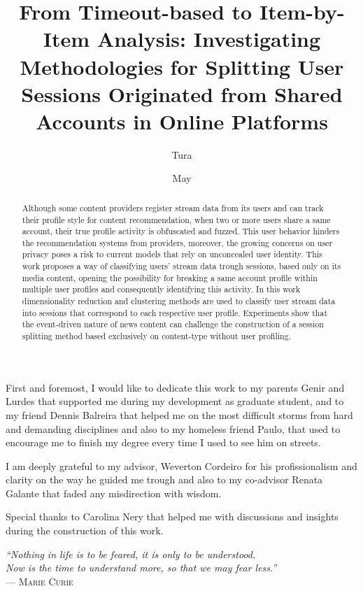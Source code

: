 \documentclass[ecp,tc,english]{iiufrgs}
\title{From Timeout-based to Item-by-Item Analysis: Investigating Methodologies for Splitting User Sessions Originated from Shared Accounts in Online Platforms}
\author{Tura}{Matheus Toazza}
\date{May}{2021}
\begin{document}
\maketitle

\begin{acknowledgements}
First and foremost, I would like to dedicate this work to my parents Genir and Lurdes that supported me during my development as graduate student, and to my friend Dennis Balreira that helped me on the most difficult storms from hard and demanding disciplines and also to my homeless friend Paulo, that used to encourage me to finish my degree every time I used to see him on streets.

I am deeply grateful to my advisor, Weverton Cordeiro for his profissionalism and clarity on the way he guided me trough and also to my co-advisor Renata Galante that faded any misdirection with wisdom.

Special thanks to Carolina Nery that helped me with discussions and insights during the construction of this work.
\end{acknowledgements}

\clearpage
\begin{flushright}
    \mbox{}
    \vfill
    {\sffamily\itshape
      ``Nothing in life is to be feared, it is only to be understood.\\
      Now is the time to understand more, so that we may fear less.''\\}
    --- \textsc{Marie Curie}
\end{flushright}

\begin{abstract}
  Although some content providers register stream data from its users and can track their profile style for content recommendation, when two or more users share a same account, their true profile activity is obfuscated and fuzzed. This user behavior hinders the recommendation systems from providers, moreover, the growing concerns on user privacy poses a risk to current models that rely on unconcealed user identity. This work proposes a way of classifying users' stream data trough sessions, based only on its media content, opening the possibility for breaking a same account profile within multiple user profiles and consequently identifying this activity. In this work dimensionality reduction and clustering methods are used to classify user stream data into sessions that correspond to each respective user profile.
  Experiments show that the event-driven nature of news content can challenge the construction of a session splitting method based exclusively on content-type without user profiling.
\end{abstract}
\end{document}
